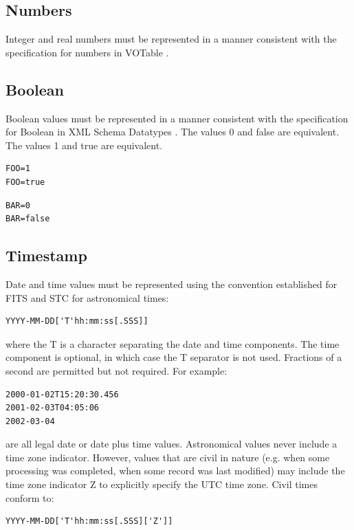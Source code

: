 \documentclass[11pt,letter]{ivoa}
\begin{document}
\subsection{Numbers}
Integer and real numbers must be represented in a manner consistent with the
specification for numbers in VOTable \citep{2019ivoa.spec.1021O}.

\subsection{Boolean}
Boolean values must be represented in a manner consistent with the
specification
for Boolean in XML Schema Datatypes \citep{std:XSD2}. The values 0 and false
are equivalent. The values 1 and true are equivalent.

\begin{verbatim}
FOO=1
FOO=true
\end{verbatim}

\begin{verbatim}
BAR=0
BAR=false
\end{verbatim}

\subsection{Timestamp}
Date and time values must be represented  using the convention established for
FITS \citep{std:FITS} and STC \citep{2007ivoa.spec.1030R} for astronomical times:

\begin{verbatim}
YYYY-MM-DD['T'hh:mm:ss[.SSS]]
\end{verbatim}

\noindent
where the T is a character separating the date and time components. The time
component is optional, in which case the T separator is not used. Fractions of a
second are permitted but not required. For example:

\begin{verbatim}
2000-01-02T15:20:30.456
2001-02-03T04:05:06
2002-03-04
\end{verbatim}

\noindent
are all legal date or date plus time values. Astronomical values never
include a time zone indicator. However, values that
are civil in nature (e.g. when some processing was completed, when some record
was last modified) may include the time zone indicator Z to explicitly specify
the UTC time zone. Civil times conform to:

\begin{verbatim}
YYYY-MM-DD['T'hh:mm:ss[.SSS]['Z']]
\end{verbatim}
\end{document}
